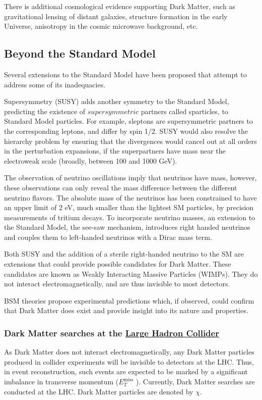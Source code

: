 \documentclass[12pt,a4paper,openright,twoside]{report}
\newcommand{\met}{$E_T^{\mathrm{miss}}$ }
\begin{document}
There is additional cosmological evidence supporting Dark Matter, such as gravitational lensing of distant galaxies, structure formation in the early Universe, anisotropy in the cosmic microwave background, etc.

\subsection{Beyond the Standard Model}
Several extensions to the Standard Model have been proposed that attempt to address some of its inadequacies. 

Supersymmetry (SUSY) adds another symmetry to the Standard Model, predicting the existence of $supersymmetric$ partners called sparticles, to Standard Model particles. For example, sleptons are supersymmetric partners to the corresponding leptons, and differ by spin 1/2. SUSY would also resolve the hierarchy problem by ensuring that the divergences would cancel out at all orders in the perturbation expansions, if the superpartners have mass near the electroweak scale (broadly, between 100 and 1000 GeV).

The observation of neutrino oscillations imply that neutrinos have mass, however, these observations can only reveal the mass difference between the different neutrino flavors. The absolute mass of the neutrinos has been constrained to have an upper limit of 2 eV, much smaller than the lightest SM particles, by precision measurements of tritium decays. To incorporate neutrino masses, an extension to the Standard Model, the see-saw mechanism, introduces right handed neutrinos and couples them to left-handed neutrinos with a Dirac mass term.

Both SUSY and the addition of a sterile right-handed neutrino to the SM are extensions that could provide possible candidates for Dark Matter. These candidates are known as Weakly Interacting Massive Particles (WIMPs). They do not interact electromagnetically, and are thus invisible to most detectors.

BSM theories propose experimental predictions which, if observed, could confirm that Dark Matter does exist and provide insight into its nature and properties.

\subsubsection{Dark Matter searches at the \hyperref[ch:LHC]{Large Hadron Collider}}

As Dark Matter does not interact electromagnetically, any Dark Matter particles produced in collider experiments will be invisible to detectors at the LHC. Thus, in event reconstruction, such events are expected to be marked by a significant imbalance in transverse momentum (\met). Currently, Dark Matter searches are conducted at the LHC\cite{DM_searches}. Dark Matter particles are denoted by $\chi$.
\end{document}
